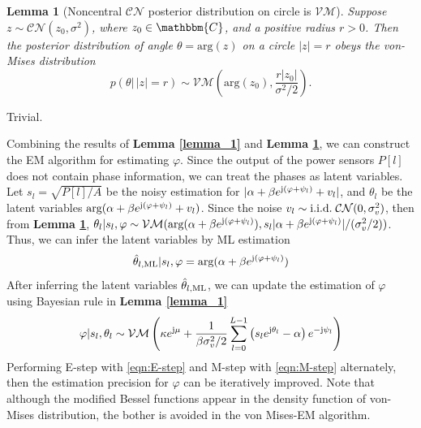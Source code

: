 \documentclass[12pt,draftclsnofoot,journal,onecolumn]{IEEEtran}
\newtheorem{lemma}{\bf Lemma}
\theoremstyle{nonumberplain}
\def \arg {\text{arg}}
\def \CN {\mathcal{CN}}
\def \VM {\mathcal{VM}}
\begin{document}
    \begin{lemma}[Noncentral $\CN$ posterior distribution on circle is $\VM$]\label{lemma_2}
        Suppose $z \sim \CN(z_0, \sigma^2)$, where $z_0 \in \mathbbm{C}$, and a positive radius $r>0$. Then the posterior distribution of angle $\theta= \arg (z)$ on a circle $|z|=r$ obeys the von-Mises distribution
        \begin{equation}
            p(\theta |\, |z|=r) \sim \VM\left(\arg(z_0), \frac{r|z_0|}{\sigma^2/2}\right).
        \end{equation}
    \end{lemma}
    \begin{IEEEproof}
        Trivial.
    \end{IEEEproof}
    Combining the results of {\bf Lemma \ref{lemma_1}} and {\bf Lemma \ref{lemma_2}}, we can construct the EM algorithm for estimating $\varphi$. Since the output of the power sensors $P[l]$ does not contain phase information, we can treat the phases as latent variables. Let $s_l = \sqrt{P[l]/A}$ be the noisy estimation for $|\alpha + \beta e^{{\rm j} (\varphi + \psi_l)} + v_l|$, and $\theta_l$ be the latent variables $\arg (\alpha + \beta e^{{\rm j} (\varphi + \psi_l)} + v_l)$. Since the noise $v_l \sim {\rm i.i.d.}\;\CN(0, \sigma_v^2)$, then from {\bf Lemma \ref{lemma_2}}, $\theta_l | s_l, \varphi \sim \VM(\arg(\alpha + \beta e^{{\rm j} (\varphi + \psi_l)}), s_l |\alpha + \beta e^{{\rm j} (\varphi + \psi_l)}|/(\sigma_v^2/2))$. Thus, we can infer the latent variables by ML estimation 
    \begin{equation}
        \hat{\theta}_{l, {\rm ML}} | s_l, \varphi = \arg(\alpha + \beta e^{{\rm j} (\varphi + \psi_l)})
        \label{eqn:E-step}
    \end{equation}
    After inferring the latent variables $\hat{\theta}_{l, {\rm ML}}$, we can update the estimation of $\varphi$ using Bayesian rule in {\bf Lemma \ref{lemma_1}}
    \begin{equation}
        \varphi | s_l, \theta_l \sim \VM\left( \kappa e^{{\rm j} \mu} + \frac{1}{\beta\sigma_v^2/2}\sum_{l=0}^{L-1}{\left(s_l e^{{\rm j}\theta_l}-\alpha\right)e^{-{\rm j} \psi_l}}\right)
        \label{eqn:M-step}
    \end{equation}
    Performing E-step with \eqref{eqn:E-step} and M-step with \eqref{eqn:M-step} alternately, then the estimation precision for $\varphi$ can be iteratively improved. Note that although the modified Bessel functions appear in the density function of von-Mises distribution, the bother is avoided in the von Mises-EM algorithm.
\end{document}

